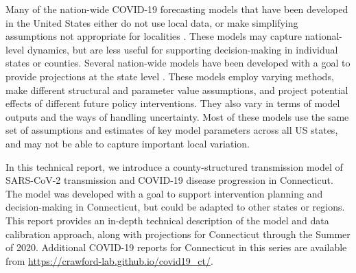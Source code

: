 \documentclass[11pt]{article}
\begin{document}
Many of the nation-wide COVID-19 forecasting models that have been developed in the United States either do not use local data, or make simplifying assumptions not appropriate for localities \citep{cdc2020covid19forecasts}. These models may capture national-level dynamics, but are less useful for supporting decision-making in individual states or counties. 
Several nation-wide models have been developed with a goal to provide projections at the state level \citep{imperial2020state, covidactnow2020you, gleam2020projections, columbia2020projections, ihme2020projections, losalamos2020projections, mit2020projections, ucla2020projections, umassamherst2020projections, utaustin2020projections, yyg2020projections}.  These models employ varying methods, make different structural and parameter value assumptions, and project potential effects of different future policy interventions. They also vary in terms of model outputs and the ways of handling uncertainty. Most of these models use the same set of assumptions and estimates of key model parameters across all US states, and may not be able to capture important local variation. 

In this technical report, we introduce a county-structured transmission model of SARS-CoV-2 transmission and COVID-19 disease progression in Connecticut.  The model was developed with a goal to support intervention planning and decision-making in Connecticut, but could be adapted to other states or regions.  This report provides an in-depth technical description of the model and data calibration approach, along with projections for Connecticut through the Summer of 2020.  Additional COVID-19 reports for Connecticut in this series are available from \url{https://crawford-lab.github.io/covid19_ct/}. 
\end{document}
